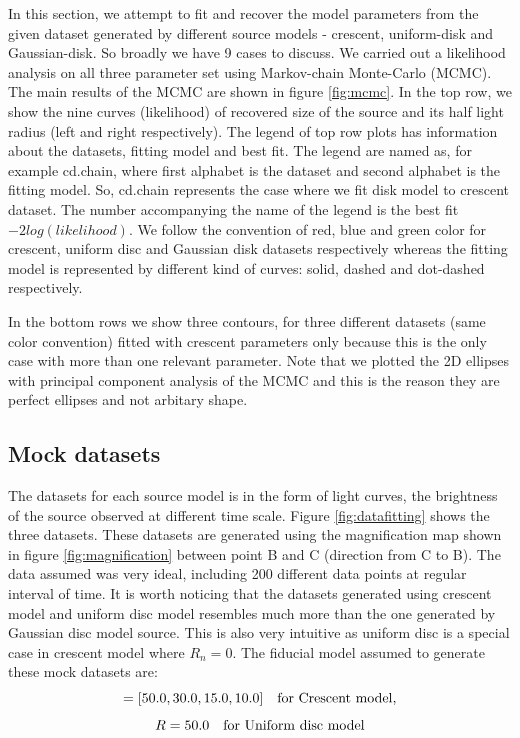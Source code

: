 In this section, we attempt to fit and recover the model parameters from the given dataset generated by different source models - crescent, uniform-disk and Gaussian-disk. So broadly we have 9 cases to discuss. We carried out a likelihood analysis on all three parameter set using Markov-chain Monte-Carlo (MCMC). The main results of the MCMC are shown in figure \ref{fig:mcmc}. In the top row, we show the nine curves (likelihood) of recovered size of the source and its half light radius (left and right respectively). The legend of top row plots has information about the datasets, fitting model and best fit. The legend are named as, for example cd.chain, where first alphabet is the dataset and second alphabet is the fitting model. So, cd.chain represents the case where we fit disk model to crescent dataset. The number accompanying the name of the legend is the best fit $-2log(likelihood)$. We follow the convention of red, blue and green color for crescent, uniform disc and Gaussian disk datasets respectively whereas the fitting model is represented by different kind of curves: solid, dashed and dot-dashed respectively.

 In the bottom rows we show three contours, for three different datasets (same color convention) fitted with crescent parameters only because this is the only case with more than one relevant parameter. Note that we plotted the 2D ellipses with principal component analysis of the MCMC and this is the reason they are perfect ellipses and not arbitary shape.

\subsection{Mock datasets}
The datasets for each source model is in the form of light curves, the brightness of the source observed at different time scale. Figure \ref{fig:datafitting} shows the three datasets. These datasets are generated using the magnification map shown in figure \ref{fig:magnification} between point B and C (direction from C to B). The data assumed was very  ideal, including 200 different data points at regular interval of time. It is worth noticing that the datasets generated using crescent model and uniform disc model resembles much more than the one generated by Gaussian disc model source. This is also very intuitive as uniform disc is a special case in crescent model where $R_n=0$. The fiducial model assumed to generate these mock datasets are:
\begin{equation}
	[R_p, R_n, a, b] = [50.0, 30.0, 15.0, 10.0]  \ \ \ \rm{for\ Crescent\ model},
	\label{eqn:cp}
\end{equation}
\begin{equation}
	R = 50.0 \ \ \ \rm{for\ Uniform\ disc\ model}
\end{equation}

